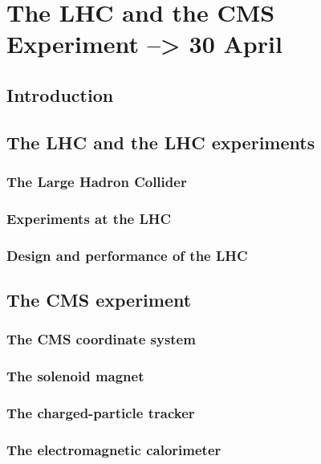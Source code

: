 \chapter{The LHC and the CMS Experiment --> 30 April} %

\label{Chapter2} %


\section{Introduction}

\section{The LHC and the LHC experiments}
\subsection{The Large Hadron Collider}
\subsection{Experiments at the LHC}
\subsection{Design and performance of the LHC}

\section{The CMS experiment}
\subsection{The CMS coordinate system} 
\subsection{The solenoid magnet} 
\subsection{The charged-particle tracker} 
\subsection{The electromagnetic calorimeter} 
